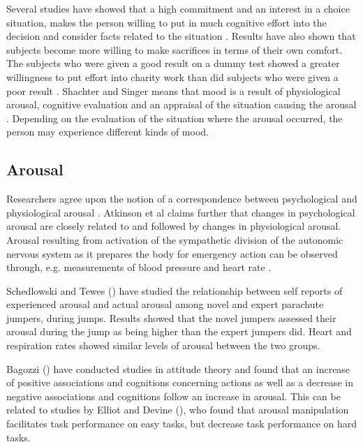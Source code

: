 \documentclass[jou,draftfirst,11pt]{apa6}
\begin{document}
Several studies have showed that a high commitment and an interest in
a choice situation, makes the person willing to put in much cognitive
effort into the decision and consider facts related to the situation
\parencite{festinger64, Izard77, JanisMann77}.  Results have also
shown that subjects become more willing to make sacrifices in terms of
their own comfort.  The subjects who were given a good result on a
dummy test showed a greater willingness to put effort into charity
work than did subjects who were given a poor result \parencite{Weyant78}.
Shachter and Singer means that mood is a result of physiological
arousal, cognitive evaluation and an appraisal of the situation
causing the arousal \parencite{SchachterSinger62}.  Depending on the
evaluation of the situation where the arousal occurred, the person may
experience different kinds of mood.


\subsection{Arousal}

Researchers agree upon the notion of a correspondence between
psychological and physiological arousal \parencite{Atkinson93}.
Atkinson et al claims further that changes in
psychological arousal are closely related to and followed by changes
in physiological arousal.  Arousal resulting from activation of the
sympathetic division of the autonomic nervous system as it prepares
the body for emergency action can be observed through,
e.g. measurements of blood pressure and heart rate
\parencite{Atkinson93}.

Schedlowski and Tewes (\citeyear{SchedlowskiTewes92}) have studied the
relationship between self reports of experienced arousal and actual
arousal among novel and expert parachute jumpers, during jumps.
Results showed that the novel jumpers assessed their arousal during
the jump as being higher than the expert jumpers did.  Heart and
respiration rates showed similar levels of arousal between the two
groups.

Bagozzi (\citeyear{Bagozzi95}) have conducted studies in attitude
theory and  found 
that an increase of positive associations and cognitions concerning
actions as well as a decrease in negative associations and cognitions
follow an increase in arousal. This can be related to studies by
Elliot and Devine (\citeyear{ElliotDevine94}), who found that arousal
manipulation facilitates task performance on easy tasks, but decrease
task performance on hard tasks.
\end{document}
